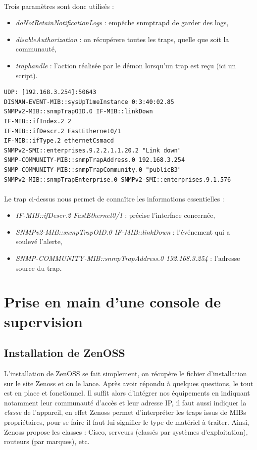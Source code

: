 \documentclass[12pt,a4paper,notitlepage]{article}
\begin{document}
\paragraph{} Trois paramètres sont donc utilisés : 
\begin{itemize}
\item \textit{doNotRetainNotificationLogs} : empêche snmptrapd de garder des logs,
\item \textit{disableAuthorization} : on récupérere toutes les traps, quelle que soit la communauté,
\item \textit{traphandle} : l'action réalisée par le démon lorsqu'un trap est reçu (ici un script).
\end{itemize}\bigskip

\begin{lstlisting}[title=Exemple de trap reçue]
UDP: [192.168.3.254]:50643
DISMAN-EVENT-MIB::sysUpTimeInstance 0:3:40:02.85
SNMPv2-MIB::snmpTrapOID.0 IF-MIB::linkDown
IF-MIB::ifIndex.2 2
IF-MIB::ifDescr.2 FastEthernet0/1
IF-MIB::ifType.2 ethernetCsmacd
SNMPv2-SMI::enterprises.9.2.2.1.1.20.2 "Link down"
SNMP-COMMUNITY-MIB::snmpTrapAddress.0 192.168.3.254
SNMP-COMMUNITY-MIB::snmpTrapCommunity.0 "publicB3"
SNMPv2-MIB::snmpTrapEnterprise.0 SNMPv2-SMI::enterprises.9.1.576
\end{lstlisting}

\paragraph{} Le trap ci-dessus nous permet de connaître les informations essentielles :
\begin{itemize}
\item \textit{IF-MIB::ifDescr.2 FastEthernet0/1} : précise l'interface concernée,
\item \textit{SNMPv2-MIB::snmpTrapOID.0 IF-MIB::linkDown} : l'événement qui a soulevé l'alerte,
\item \textit{SNMP-COMMUNITY-MIB::snmpTrapAddress.0 192.168.3.254} : l'adresse source du trap.
\end{itemize}


\section{Prise en main d'une console de supervision}
\subsection{Installation de ZenOSS}
L'installation de ZenOSS se fait simplement, on récupère le fichier d'installation sur le site Zenoss et on le lance. Après avoir répondu à quelques questions, le tout est en place et fonctionnel. Il suffit alors d'intégrer nos équipements en indiquant notamment leur communauté d'accès et leur adresse IP, il faut aussi indiquer la \textit{classe} de l'appareil, en effet Zenoss permet d'interpréter les traps issus de MIBs propriétaires, pour se faire il faut lui signifier le type de matériel à traiter. Ainsi, Zenoss propose les classes : Cisco, serveurs (classés par systèmes d'exploitation), routeurs (par marques), etc.
\end{document}
